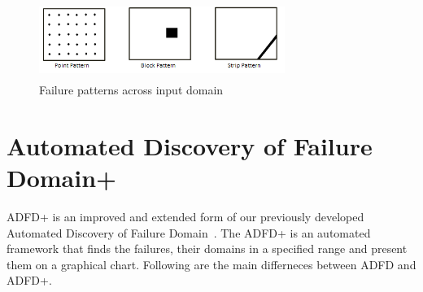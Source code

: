 \begin{figure}[ht]                                    
\centering
\includegraphics[width= 8cm,height=2.5cm]{ART_Patterns.png}
\caption{Failure patterns across input domain~\cite{chan1996proportional}}
\label{fig:failurePatterns}
\end{figure}



 


\section{Automated Discovery of Failure Domain+}\label{sec:adfd+}
ADFD+ is an improved and extended form of our previously developed Automated Discovery of Failure Domain~\cite{ahmad2013adfd}. The ADFD+ is an automated framework that finds the failures, their domains in a specified range and present them on a graphical chart. Following  are the main differneces between ADFD and ADFD+.

